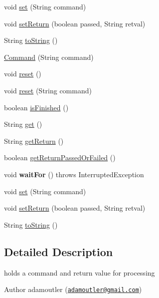 \begin{DoxyCompactItemize}
\item 
void \hyperlink{class_c_a_s_u_a_l_1_1language_1_1_command_a753e9e3907c53f7c147133f9c2400a5a}{set} (String command)
\item 
void \hyperlink{class_c_a_s_u_a_l_1_1language_1_1_command_a9650a724ad559edf3c7d8fe69cabbacd}{set\-Return} (boolean passed, String retval)
\item 
String \hyperlink{class_c_a_s_u_a_l_1_1language_1_1_command_a668aa9e12c8e5d93185a4568aa38c22c}{to\-String} ()
\item 
\hyperlink{class_c_a_s_u_a_l_1_1language_1_1_command_ab0a52d9b3d71ee95e39b1c2ce5e63068}{Command} (String command)
\item 
void \hyperlink{class_c_a_s_u_a_l_1_1language_1_1_command_a073d66b1e44a37641668557028e573de}{reset} ()
\item 
void \hyperlink{class_c_a_s_u_a_l_1_1language_1_1_command_a71d195d98823e45cc611d0e5809f8fcb}{reset} (String command)
\item 
boolean \hyperlink{class_c_a_s_u_a_l_1_1language_1_1_command_a196f46b8e013dbec4a1dfc645bcc6334}{is\-Finished} ()
\item 
String \hyperlink{class_c_a_s_u_a_l_1_1language_1_1_command_a441877ec1df39754c0e158e79db295be}{get} ()
\item 
String \hyperlink{class_c_a_s_u_a_l_1_1language_1_1_command_ae35c680d370afbd0219372a21a1a870f}{get\-Return} ()
\item 
boolean \hyperlink{class_c_a_s_u_a_l_1_1language_1_1_command_a105e38ee16fccdb3340a93f661d5d61b}{get\-Return\-Passed\-Or\-Failed} ()
\item 
\hypertarget{class_c_a_s_u_a_l_1_1language_1_1_command_ad05ac4b7c9cbd0e781f234d8cbe38958}{void {\bfseries wait\-For} ()  throws Interrupted\-Exception }\label{class_c_a_s_u_a_l_1_1language_1_1_command_ad05ac4b7c9cbd0e781f234d8cbe38958}

\item 
void \hyperlink{class_c_a_s_u_a_l_1_1language_1_1_command_a753e9e3907c53f7c147133f9c2400a5a}{set} (String command)
\item 
void \hyperlink{class_c_a_s_u_a_l_1_1language_1_1_command_a9650a724ad559edf3c7d8fe69cabbacd}{set\-Return} (boolean passed, String retval)
\item 
String \hyperlink{class_c_a_s_u_a_l_1_1language_1_1_command_a668aa9e12c8e5d93185a4568aa38c22c}{to\-String} ()
\end{DoxyCompactItemize}


\subsection{Detailed Description}
holds a command and return value for processing \begin{DoxyAuthor}{Author}
adamoutler (\href{mailto:adamoutler@gmail.com}{\tt adamoutler@gmail.\-com}) 
\end{DoxyAuthor}



